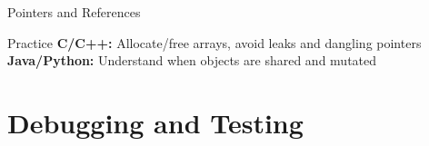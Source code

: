 \documentclass[aspectratio=169,xcolor=dvipsnames]{beamer}
\begin{document}
\begin{frame}[fragile]{Pointers and References}
  \vspace{0.3cm}

  \begin{block}{Practice}
    \textbf{C/C++:} Allocate/free arrays, avoid leaks and dangling pointers \\
    \textbf{Java/Python:} Understand when objects are shared and mutated
  \end{block}
\end{frame}

\section{Debugging and Testing}
\end{document}
